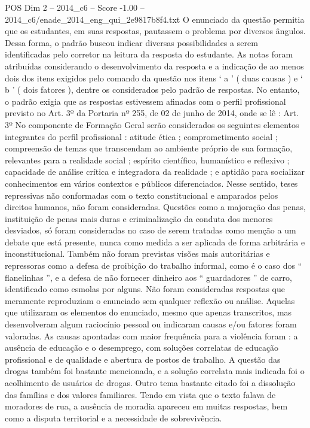 \begin{textsample}{POS Dim 2 – 2014\_c6 – Score -1.00 – 2014\_c6/enade\_2014\_eng\_qui\_2e9817b8f4.txt}
O enunciado da questão permitia que os estudantes, em suas respostas, pautassem o problema por diversos ângulos.
Dessa forma, o padrão buscou indicar diversas possibilidades a serem identificadas pelo corretor na leitura da resposta do estudante.
As notas foram atribuídas considerando o desenvolvimento da resposta e a indicação de ao menos dois dos itens exigidos pelo comando da questão nos itens ‘ a ’ ( duas causas ) e ‘ b ’ ( dois fatores ), dentre os considerados pelo padrão de respostas.
No entanto, o padrão exigia que as respostas estivessem afinadas com o perfil profissional previsto no Art. 3º da Portaria nº 255, de 02 de junho de 2014, onde se lê : Art. 3º No componente de Formação Geral serão considerados os seguintes elementos integrantes do perfil profissional : atitude ética ; comprometimento social ; compreensão de temas que transcendam ao ambiente próprio de sua formação, relevantes para a realidade social ; espírito científico, humanístico e reflexivo ; capacidade de análise crítica e integradora da realidade ; e aptidão para socializar conhecimentos em vários contextos e públicos diferenciados.
Nesse sentido, teses repressivas não conformadas com o texto constitucional e amparados pelos direitos humanos, não foram consideradas.
Questões como a majoração das penas, instituição de penas mais duras e criminalização da conduta dos menores desviados, só foram consideradas no caso de serem tratadas como menção a um debate que está presente, nunca como medida a ser aplicada de forma arbitrária e inconstitucional.
Também não foram previstas visões mais autoritárias e repressoras como a defesa de proibição do trabalho informal, como é o caso dos “ flanelinhas ”, e a defesa de não fornecer dinheiro aos “ guardadores ” de carro, identificado como esmolas por alguns.
Não foram consideradas respostas que meramente reproduziam o enunciado sem qualquer reflexão ou análise.
Aquelas que utilizaram os elementos do enunciado, mesmo que apenas transcritos, mas desenvolveram algum raciocínio pessoal ou indicaram causas e/ou fatores foram valoradas.
As causas apontadas com maior frequência para a violência foram : a ausência de educação e o desemprego, com soluções correlatas de educação profissional e de qualidade e abertura de postos de trabalho.
A questão das drogas também foi bastante mencionada, e a solução correlata mais indicada foi o acolhimento de usuários de drogas.
Outro tema bastante citado foi a dissolução das famílias e dos valores familiares.
Tendo em vista que o texto falava de moradores de rua, a ausência de moradia apareceu em muitas respostas, bem como a disputa territorial e a necessidade de sobrevivência.

\end{textsample}
